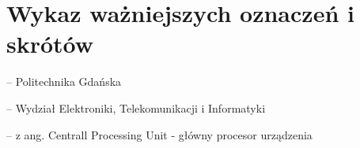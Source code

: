 
\clearpage
\section*{Wykaz ważniejszych oznaczeń i skrótów} %

\begin{description}[leftmargin=2.5cm,labelwidth=2cm]
\item[PG] -- Politechnika Gdańska
\item[WETI] -- Wydział Elektroniki, Telekomunikacji i Informatyki
\item[CPU] -- z ang. Centrall Processing Unit - główny procesor urządzenia
\end{description}
